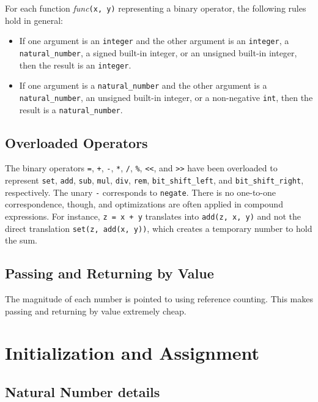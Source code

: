 \documentclass[a4paper]{article}
\begin{document}
For each function \emph{func}\texttt{(x, y)} representing a binary operator, the following rules hold in general:
\begin{itemize}
\item If one argument is an \texttt{integer} and the other argument is an \texttt{integer}, a \texttt{natural\_number}, a signed built-in integer, or an unsigned built-in integer, then the result is an \texttt{integer}.
\item If one argument is a \texttt{natural\_number} and the other argument is a \texttt{natural\_number}, an unsigned built-in integer, or a non-negative \texttt{int}, then the result is a \texttt{natural\_number}.
\end{itemize}

\subsection{Overloaded Operators}

The binary operators \texttt{=}, \texttt{+}, \texttt{-}, \texttt{*}, \texttt{/}, \texttt{\%}, \texttt{<<}, and \texttt{>>} have been overloaded to represent \texttt{set}, \texttt{add}, \texttt{sub}, \texttt{mul}, \texttt{div}, \texttt{rem}, \texttt{bit\_shift\_left}, and \texttt{bit\_shift\_right}, respectively. The unary \texttt{-} corresponds to \texttt{negate}. There is no one-to-one correspondence, though, and optimizations are often applied in compound expressions. For instance, \texttt{z = x + y} translates into \texttt{add(z, x, y)} and not the direct translation \texttt{set(z, add(x, y))}, which creates a temporary number to hold the sum.

\subsection{Passing and Returning by Value}

The magnitude of each number is pointed to using reference counting. This makes passing and returning by value extremely cheap.

\section{Initialization and Assignment}

\subsection{Natural Number details}
\end{document}
